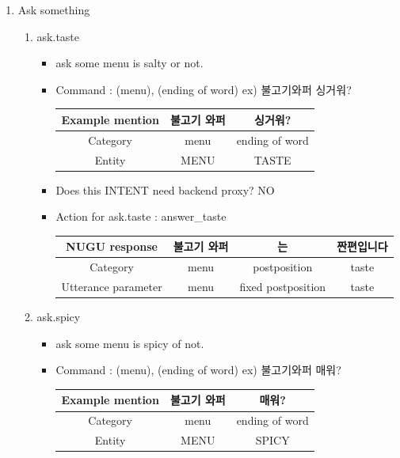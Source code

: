 \documentclass[conference,compsoc]{IEEEtran}
\begin{document}
\begin{enumerate}
\begin{enumerate}
  \end{enumerate}

  \item Ask something
  \begin{enumerate}
    \item ask.taste
    \begin{itemize}
      \item ask some menu is salty or not.
      \item Command : (menu), (ending of word) ex) 불고기와퍼 싱거워?
      \begin{table}[ht!] \renewcommand\arraystretch{1.25}
        \centering
          \begin{tabular}{@{}c | c c @{}}
          \hline
          Example mention & 불고기 와퍼 & 싱거워?  \\ 
          \hline
          Category        & menu   & ending of word  \\ 
          \hline
          Entity  & MENU   & TASTE   \\
          \hline
          \end{tabular}
      \end{table}  

      \item Does this INTENT need backend proxy? NO
      \item Action for ask.taste : answer\_taste
      \begin{table}[ht!] \renewcommand\arraystretch{1.25}
        \centering
          \begin{tabular}{@{}c | c c c @{}}
          \hline
          NUGU response & 불고기 와퍼 & 는  & 짠편입니다 \\ 
          \hline
          Category        & menu   & postposition & taste \\ 
          \hline
          Utterance parameter  & {{menu}}   & fixed postposition & {{taste}} \\
          \hline
          \end{tabular}
      \end{table}  
    \end{itemize}
    
    \item ask.spicy
    \begin{itemize}
      \item ask some menu is spicy of not.
      \item Command : (menu), (ending of word) ex) 불고기와퍼 매워?
      \begin{table}[ht!] \renewcommand\arraystretch{1.25}
        \centering
          \begin{tabular}{@{}c | c c @{}}
          \hline
          Example mention & 불고기 와퍼 & 매워?  \\ 
          \hline
          Category        & menu   & ending of word  \\ 
          \hline
          Entity  & MENU   & SPICY   \\
          \hline
          \end{tabular}
      \end{table}  


\end{itemize}
\end{enumerate}
\end{enumerate}
\end{document}
